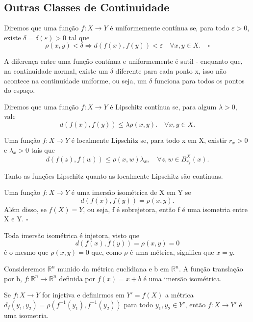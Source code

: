 \documentclass[MetricSpaces/metric_notes.tex]{subfiles}
\begin{document}
\subsection{Outras Classes de Continuidade}
\begin{def*}
	Diremos que uma função \(f:X\rightarrow Y\) é uniformemente contínua se, para todo \(\varepsilon >0\), existe \(\delta =\delta (\varepsilon )>0\) tal que
	\[
		\rho (x, y) < \delta \Rightarrow d(f(x), f(y)) < \varepsilon \quad \forall x, y\in X.\quad\square
	\]
\end{def*}
A diferença entre uma função contínua e uniformemente é sutil - enquanto que, na continuidade normal, existe um \(\delta \) diferente para cada ponto x, isso não acontece
na continuidade uniforme, ou seja, um \(\delta \) funciona para todos os pontos do espaço.
\begin{def*}
	Diremos que uma função \(f:X\rightarrow Y\) é Lipschitz contínua se, para algum \(\lambda >0\), vale
	\[
		d(f(x), f(y))\leq \lambda \rho (x, y).\quad \forall x, y\in X.
	\]
\end{def*}
\begin{def*}
	Uma função \(f:X\rightarrow Y\) é localmente Lipschitz se, para todo x em X, existir \(r_{x}>0\) e \(\lambda_{x}>0\) tais que
	\[
		d(f(z), f(w))\leq \rho (x, w)\lambda_{x},\quad \forall z, w\in B_{r_{x}}^{X}(x).
	\]
\end{def*}
Tanto as funções Lipschitz quanto as localmente Lipschitz são contínuas.
\begin{def*}
	Uma função \(f:X\rightarrow Y\) é uma imersão isométrica de X em Y se
	\[
		d(f(x), f(y)) = \rho (x, y).
	\]
	Além disso, se \(f(X) = Y\), ou seja, f é sobrejetora, então f é uma isometria entre X e Y. \(\square\)
\end{def*}
Toda imersão isométrica é injetora, visto que
\[
	d(f(x), f(y)) = \rho (x, y) = 0
\]
é o mesmo que \(\rho (x, y) = 0\) que, como \(\rho \) é uma métrica, significa que \(x=y\).
\begin{example}
	Consideremos \(\mathbb{R}^{n}\) munido da métrica euclidiana e b em \(\mathbb{R}^{n}.\) A função translação por b,
	\(f:\mathbb{R}^{n}\rightarrow \mathbb{R}^{n}\) definida por \(f(x) = x + b\) é uma imersão isométrica.
\end{example}
\begin{example}
	Se \(f:X\rightarrow Y\) for injetiva e definirmos em \(Y' = f(X)\) a métrica
	\(d_{f}(y_{1}, y_{2}) = \rho (f^{-1}(y_{1}), f^{-1}(y_{2}))\) para todo \(y_{1}, y_{2}\in Y'\), então
	\(f:X\rightarrow Y'\) é uma isometria.
\end{example}
\end{document}
